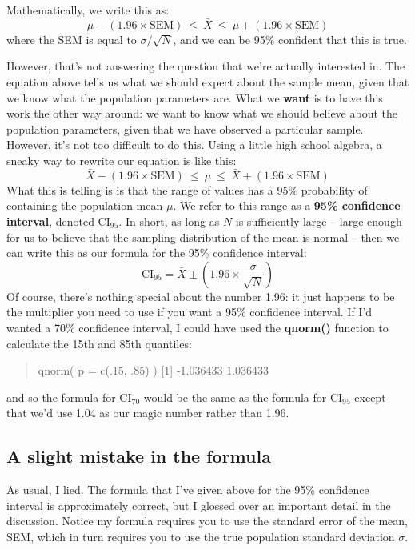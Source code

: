 \documentclass[
]{book}
\begin{document}
Mathematically, we write this as: \[\mu - \left( 1.96 \times \mbox{SEM} \right) \ \leq \  \bar{X}\  \leq \  \mu + \left( 1.96 \times \mbox{SEM} \right)\] where the SEM is equal to \(\sigma / \sqrt{N}\), and we can be 95\% confident that this is true.

However, that's not answering the question that we're actually interested in. The equation above tells us what we should expect about the sample mean, given that we know what the population parameters are. What we \textbf{want} is to have this work the other way around: we want to know what we should believe about the population parameters, given that we have observed a particular sample. However, it's not too difficult to do this. Using a little high school algebra, a sneaky way to rewrite our equation is like this: \[\bar{X} -  \left( 1.96 \times \mbox{SEM} \right) \ \leq \ \mu  \ \leq  \ \bar{X} +  \left( 1.96 \times \mbox{SEM}\right)\] What this is telling is is that the range of values has a 95\% probability of containing the population mean \(\mu\). We refer to this range as a \textbf{95\% confidence interval}, denoted \(\mbox{CI}_{95}\). In short, as long as \(N\) is sufficiently large -- large enough for us to believe that the sampling distribution of the mean is normal -- then we can write this as our formula for the 95\% confidence interval: \[\mbox{CI}_{95} = \bar{X} \pm \left( 1.96 \times \frac{\sigma}{\sqrt{N}} \right)\] Of course, there's nothing special about the number 1.96: it just happens to be the multiplier you need to use if you want a 95\% confidence interval. If I'd wanted a 70\% confidence interval, I could have used the \textbf{qnorm()} function to calculate the 15th and 85th quantiles:

\begin{quote}
qnorm( p = c(.15, .85) ) {[}1{]} -1.036433 1.036433
\end{quote}

and so the formula for \(\mbox{CI}_{70}\) would be the same as the formula for \(\mbox{CI}_{95}\) except that we'd use 1.04 as our magic number rather than 1.96.

\hypertarget{a-slight-mistake-in-the-formula}{%
\subsection{A slight mistake in the formula}\label{a-slight-mistake-in-the-formula}}

As usual, I lied. The formula that I've given above for the 95\% confidence interval is approximately correct, but I glossed over an important detail in the discussion. Notice my formula requires you to use the standard error of the mean, SEM, which in turn requires you to use the true population standard deviation \(\sigma\).
\end{document}
